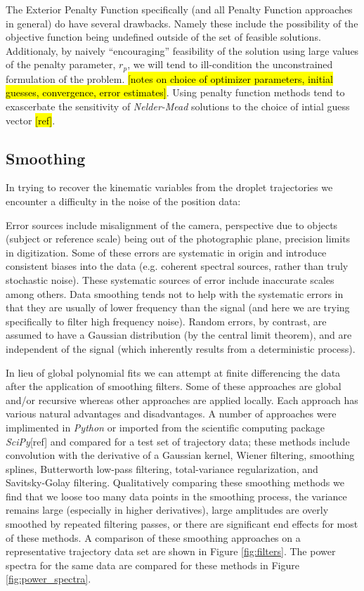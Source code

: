 \documentclass[10pt,a4paper]{article}
\begin{document}
The Exterior Penalty Function specifically (and all Penalty Function approaches in general) do have several drawbacks. Namely these include the possibility of the objective function being undefined outside of the set of feasible solutions. Additionaly, by naively ``encouraging'' feasibility of the solution using large values of the penalty parameter, $r_p$, we will tend to ill-condition the unconstrained formulation of the problem.
\hl{[notes on choice of optimizer parameters, initial guesses, convergence, error estimates]}. Using penalty function methods tend to exascerbate the sensitivity of \emph{Nelder-Mead} solutions to the choice of intial guess vector \hl{[ref]}. 

\subsection*{Smoothing}
In trying to recover the kinematic variables from the droplet trajectories we encounter a difficulty in the noise of the position data:

Error sources include misalignment of the camera, perspective due to objects (subject or reference scale) being out of the photographic plane, precision limits in digitization. Some of these errors are systematic in origin and introduce consistent biases into the data (e.g. coherent spectral sources, rather than truly stochastic noise). These systematic sources of error include inaccurate scales among others. Data smoothing tends not to help with the systematic errors in that they are usually of lower frequency than the signal (and here we are trying specifically to filter high frequency noise). Random errors, by contrast, are assumed to have a Gaussian distribution (by the central limit theorem), and are independent of the signal (which inherently results from a deterministic process).

In lieu of global polynomial fits we can attempt at finite differencing the data after the application of smoothing filters. Some of these approaches are global and/or recursive whereas other approaches are applied locally. Each approach has various natural advantages and disadvantages. A number of approaches were implimented in \emph{Python} or imported from the scientific computing package \emph{SciPy}[ref] and compared for a test set of trajectory data; these methods include convolution with the derivative of a Gaussian kernel, Wiener filtering, smoothing splines, Butterworth low-pass filtering, total-variance regularization, and Savitsky-Golay filtering. Qualitatively comparing these smoothing methods we find that we loose too many data points in the smoothing process, the variance remains large (especially in higher derivatives), large amplitudes are overly smoothed by repeated filtering passes, or there are significant end effects for most of these methods. A comparison of these smoothing approaches on a representative trajectory data set are shown in Figure \ref{fig:filters}. The power spectra for the same data are compared for these methods in Figure \ref{fig:power_spectra}.
\end{document}
